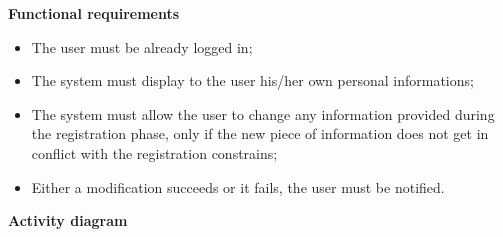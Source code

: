 \documentclass{article}
\begin{document}
	\bigskip
	\noindent
	\textbf{Functional requirements} \\
	\begin{itemize}
		\item The user must be already logged in;
		\item The system must display to the user his/her own personal informations;
		\item The system must allow the user to change any information provided during the registration phase, only if the new piece of information does not get in conflict with the registration constrains;
		\item Either a modification succeeds or it fails, the user must be notified.
	\end{itemize}
	
	\newpage
	\noindent
	\textbf{Activity diagram} \\
	
\end{document}
